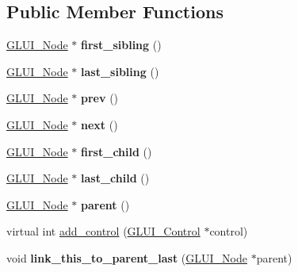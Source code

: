 \subsection*{Public Member Functions}
\begin{DoxyCompactItemize}
\item 
\hypertarget{classGLUI__Node_ad5b0767f3f65a74b8401f531d6850ea8}{\hyperlink{classGLUI__Node}{G\-L\-U\-I\-\_\-\-Node} $\ast$ {\bfseries first\-\_\-sibling} ()}\label{classGLUI__Node_ad5b0767f3f65a74b8401f531d6850ea8}

\item 
\hypertarget{classGLUI__Node_abc79bf831b2789f9c3e8231e6b1afc9f}{\hyperlink{classGLUI__Node}{G\-L\-U\-I\-\_\-\-Node} $\ast$ {\bfseries last\-\_\-sibling} ()}\label{classGLUI__Node_abc79bf831b2789f9c3e8231e6b1afc9f}

\item 
\hypertarget{classGLUI__Node_a342a7d46592ce4d9dd9572fae09ead22}{\hyperlink{classGLUI__Node}{G\-L\-U\-I\-\_\-\-Node} $\ast$ {\bfseries prev} ()}\label{classGLUI__Node_a342a7d46592ce4d9dd9572fae09ead22}

\item 
\hypertarget{classGLUI__Node_a9752733c92840813b27147ab87d77a69}{\hyperlink{classGLUI__Node}{G\-L\-U\-I\-\_\-\-Node} $\ast$ {\bfseries next} ()}\label{classGLUI__Node_a9752733c92840813b27147ab87d77a69}

\item 
\hypertarget{classGLUI__Node_a631b094804b887c0d091ece2786543d1}{\hyperlink{classGLUI__Node}{G\-L\-U\-I\-\_\-\-Node} $\ast$ {\bfseries first\-\_\-child} ()}\label{classGLUI__Node_a631b094804b887c0d091ece2786543d1}

\item 
\hypertarget{classGLUI__Node_a4825cdc843f0e2b46d75fe5cb9e8ba35}{\hyperlink{classGLUI__Node}{G\-L\-U\-I\-\_\-\-Node} $\ast$ {\bfseries last\-\_\-child} ()}\label{classGLUI__Node_a4825cdc843f0e2b46d75fe5cb9e8ba35}

\item 
\hypertarget{classGLUI__Node_a8ed65d447784f6f88bd3e2e2bcac6cdb}{\hyperlink{classGLUI__Node}{G\-L\-U\-I\-\_\-\-Node} $\ast$ {\bfseries parent} ()}\label{classGLUI__Node_a8ed65d447784f6f88bd3e2e2bcac6cdb}

\item 
virtual int \hyperlink{classGLUI__Node_afa7031b826994d524f219ea5016c113c}{add\-\_\-control} (\hyperlink{classGLUI__Control}{G\-L\-U\-I\-\_\-\-Control} $\ast$control)
\item 
\hypertarget{classGLUI__Node_a28eb5c7bf5a0edf5b7ba2502384c6544}{void {\bfseries link\-\_\-this\-\_\-to\-\_\-parent\-\_\-last} (\hyperlink{classGLUI__Node}{G\-L\-U\-I\-\_\-\-Node} $\ast$parent)}\label{classGLUI__Node_a28eb5c7bf5a0edf5b7ba2502384c6544}


\end{DoxyCompactItemize}
